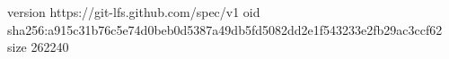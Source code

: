 version https://git-lfs.github.com/spec/v1
oid sha256:a915c31b76c5e74d0beb0d5387a49db5fd5082dd2e1f543233e2fb29ac3ccf62
size 262240
